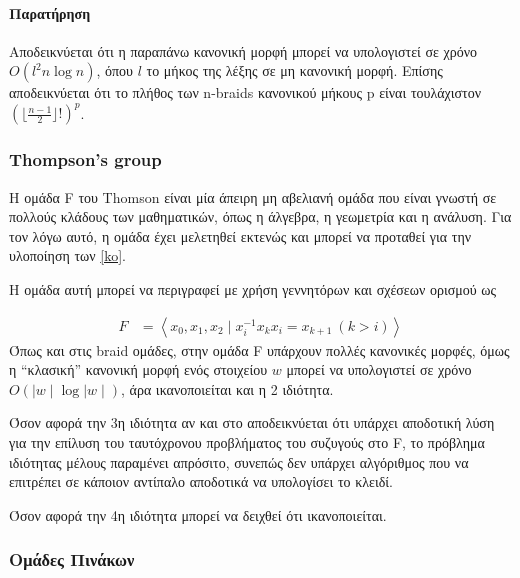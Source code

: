 \paragraph{Παρατήρηση}
Αποδεικνύεται ότι η παραπάνω κανονική μορφή μπορεί να υπολογιστεί σε χρόνο $O(l^2 n\log n)$, όπου $l$ το μήκος της λέξης σε μη κανονική μορφή. Επίσης αποδεικνύεται ότι το πλήθος των n-braids κανονικού μήκους p είναι τουλάχιστον $(\lfloor\frac{n-1}{2}\rfloor !)^p$. 


\subsubsection{Thompson's group}

Η ομάδα F του Thomson \cite{belk-2007} είναι μία άπειρη μη αβελιανή ομάδα που είναι γνωστή σε πολλούς κλάδους των μαθηματικών, όπως η άλγεβρα, η γεωμετρία και η ανάλυση. Για τον λόγω αυτό, η ομάδα έχει μελετηθεί εκτενώς και μπορεί να προταθεί για την υλοποίηση των \ref{ko}.

Η ομάδα αυτή μπορεί να περιγραφεί με χρήση γεννητόρων και σχέσεων ορισμού ως 

\begin{align*}
F&=\left\langle x_0, x_1, x_2  \mid x_i^{-1}x_kx_i = x_{k+1} \ (k>i) \right\rangle
\end{align*}
Όπως και στις braid ομάδες, στην ομάδα F υπάρχουν πολλές κανονικές μορφές, όμως η ``κλασική'' κανονική μορφή ενός στοιχείου $ w $ μπορεί να υπολογιστεί σε χρόνο $ O(\mid w \mid \log{\mid w \mid}) $, άρα ικανοποιείται και η 2 ιδιότητα.

Όσον αφορά την 3η ιδιότητα αν και στο \cite{cf} αποδεικνύεται ότι υπάρχει αποδοτική λύση για την επίλυση του ταυτόχρονου προβλήματος του συζυγούς στο F, το πρόβλημα ιδιότητας μέλους παραμένει απρόσιτο, συνεπώς δεν υπάρχει αλγόριθμος που να επιτρέπει σε κάποιον αντίπαλο αποδοτικά να υπολογίσει το κλειδί.

Όσον αφορά την 4η ιδιότητα μπορεί να δειχθεί \cite{tom} ότι ικανοποιείται.

\subsubsection{Ομάδες Πινάκων}

